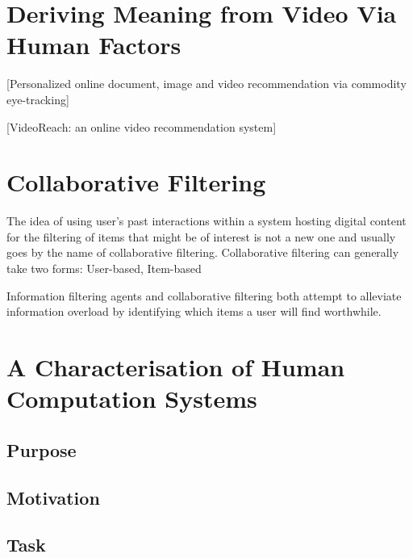 \section{Deriving Meaning from Video Via Human Factors}
[Personalized online document, image and video recommendation via commodity eye-tracking]\cite{Xu:2008vb}

[VideoReach: an online video recommendation system]\cite{Mei:2007wa}

\section{Collaborative Filtering} 


The idea of using user's past interactions within a system hosting digital content for the filtering of items that might be of interest is not a new one and usually goes by the name of collaborative filtering. 
Collaborative filtering can generally take two forms: User-based, Item-based

Information filtering agents and collaborative filtering both
attempt to alleviate information overload by identifying
which items a user will find worthwhile.


\section{A Characterisation of Human Computation Systems}
\subsection{Purpose}
\subsection{Motivation}
\subsection{Task}

